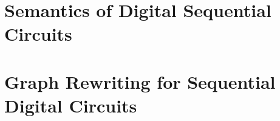 \documentclass[a4paper, oneside, 12pt, openany]{book}
\numberwithin{equation}{section}
\numberwithin{table}{section}
\begin{document}
\frontmatter


\restoregeometry%




\setcounter{tocdepth}{2}
\tableofcontents

\mainmatter%





\part{Semantics of Digital Sequential Circuits}






\part{Graph Rewriting for Sequential Digital Circuits}










\backmatter%

\printbibliography[heading=bibintoc]%
\printnomenclature%
\printindex
\end{document}

